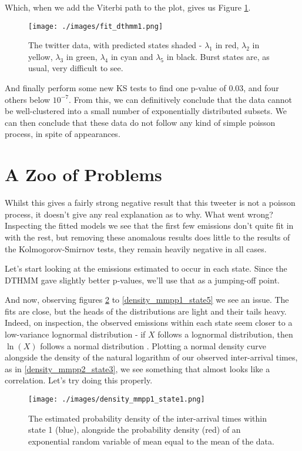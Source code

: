 Which, when we add the Viterbi path to the plot, gives us Figure \ref{fit_dthmm1}.

\begin{figure}[h!]
\texttt{[image: ./images/fit\_dthmm1.png]}
\caption{The twitter data, with predicted states shaded - $\lambda_1$ in red, $\lambda_2$ in yellow, $\lambda_3$ in green, $\lambda_4$ in cyan and $\lambda_5$ in black. Burst states are, as usual, very difficult to see.}
\label{fit_dthmm1}
\end{figure}

And finally perform some new KS tests to find one p-value of 0.03, and four others below $10^{-7}$. From this, we can definitively conclude that the data cannot be well-clustered into a small number of exponentially distributed subsets. We can then conclude that these data do not follow any kind of simple poisson process, in spite of appearances.

\section{A Zoo of Problems}

Whilst this gives a fairly strong negative result that this tweeter is not a poisson process, it doesn't give any real explanation as to why. What went wrong? Inspecting the fitted models we see that the first few emissions don't quite fit in with the rest, but removing these anomalous results does little to the results of the Kolmogorov-Smirnov tests, they remain heavily negative in all cases.

Let's start looking at the emissions estimated to occur in each state. Since the DTHMM gave slightly better p-values, we'll use that as a jumping-off point.

And now, observing figures \ref{density_mmpp1_state1} to \ref{density_mmpp1_state5} we see an issue. The fits are close, but the heads of the distributions are light and their tails heavy. Indeed, on inspection, the observed emissions within each state seem closer to a low-variance lognormal distribution - if $X$ follows a lognormal distribution, then $\ln(X)$ follows a normal distribution \cite{mwlognormal}. Plotting a normal density curve alongside the density of the natural logarithm of our observed inter-arrival times, as in \ref{density_mmpp2_state3}, we see something that almost looks like a correlation. Let's try doing this properly.

\clearpage

\begin{figure}[h!]
\texttt{[image: ./images/density\_mmpp1\_state1.png]}
\caption{The estimated probability density of the inter-arrival times within state 1 (blue), alongside the probability density (red) of an exponential random variable of mean equal to the mean of the data.}
\label{density_mmpp1_state1}
\end{figure}


